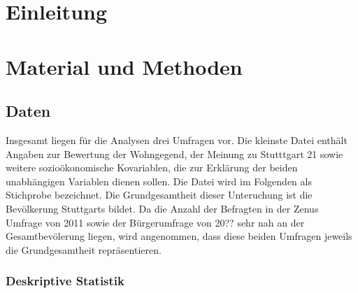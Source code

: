 \documentclass{Vorlage}
\begin{document}
\restoregeometry


\pagestyle{plain}

\tableofcontents %

\newpage %

\listoffigures %

\listoftables %

\newpage



\pagestyle{fancy}

\section{Einleitung}

\newpage

\section{Material und Methoden}
\subsection{Daten}
Insgesamt liegen für die Analysen drei Umfragen vor. Die kleinste Datei enthält Angaben zur Bewertung der Wohngegend, der Meinung zu Stutttgart 21 sowie weitere sozioökonomische Kovariablen, die zur Erklärung der beiden unabhängigen Variablen dienen sollen. Die Datei wird im Folgenden als Stichprobe bezeichnet. Die Grundgesamtheit dieser Unteruchung ist die Bevölkerung Stuttgarts bildet. Da die Anzahl der Befragten in der Zenus Umfrage von 2011 sowie der Bürgerumfrage von 20?? sehr nah an der Gesamtbevölerung liegen, wird angenommen, dass diese beiden Umfragen jeweils die Grundgesamtheit repräsentieren.




\subsubsection{Deskriptive Statistik}
\end{document}
